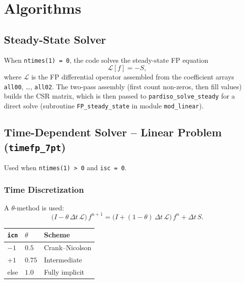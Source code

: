 \documentclass[11pt,a4paper]{article}
\newcommand{\dt}{\Delta t}
\newcommand{\Lcal}{\mathcal{L}}
\begin{document}
\section{Algorithms}

\subsection{Steady-State Solver}

When \texttt{ntimes(1) = 0}, the code solves the steady-state FP equation
\begin{equation}
  \Lcal[f] = -S,
\end{equation}
where $\Lcal$ is the FP differential operator assembled from the coefficient
arrays \texttt{all00}, \ldots, \texttt{all02}.  The two-pass assembly (first
count non-zeros, then fill values) builds the CSR matrix, which is then
passed to \texttt{pardiso\_solve\_steady} for a direct solve (subroutine
\texttt{FP\_steady\_state} in module \texttt{mod\_linear}).

\subsection{Time-Dependent Solver -- Linear Problem (\texttt{timefp\_7pt})}

Used when \texttt{ntimes(1) > 0} and \texttt{isc = 0}.

\subsubsection{Time Discretization}

A $\theta$-method is used:
\begin{equation}
  \bigl(I - \theta\,\dt\,\Lcal\bigr)\,f^{n+1}
  = \bigl(I + (1-\theta)\,\dt\,\Lcal\bigr)\,f^n + \dt\,S.
\end{equation}

\begin{center}
\begin{tabular}{lll}
\toprule
\texttt{icn} & $\theta$ & Scheme \\
\midrule
$-1$  & $0.5$  & Crank--Nicolson \\
$+1$  & $0.75$ & Intermediate \\
else  & $1.0$  & Fully implicit \\
\bottomrule
\end{tabular}
\end{center}
\end{document}
